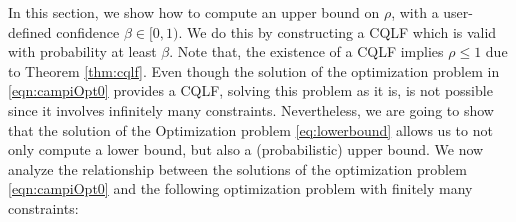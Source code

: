 In this section, we show how to compute an upper bound on $\rho$, with a user-defined confidence $\beta \in [0, 1)$. We do this by constructing a CQLF which is valid with probability at least $\beta$. Note that, the existence of a CQLF implies $\rho \leq 1$ due to Theorem \ref{thm:cqlf}.
Even though the solution of the optimization problem in \eqref{eqn:campiOpt0} provides a CQLF, solving this problem as it is, is not possible since it involves infinitely many constraints. Nevertheless, we are going to show that the solution of the Optimization problem \eqref{eq:lowerbound} allows us to not only compute a lower bound, but also a (probabilistic) upper bound.
We now analyze the relationship between the solutions of the optimization problem \eqref{eqn:campiOpt0} and the following optimization problem with finitely many constraints:

